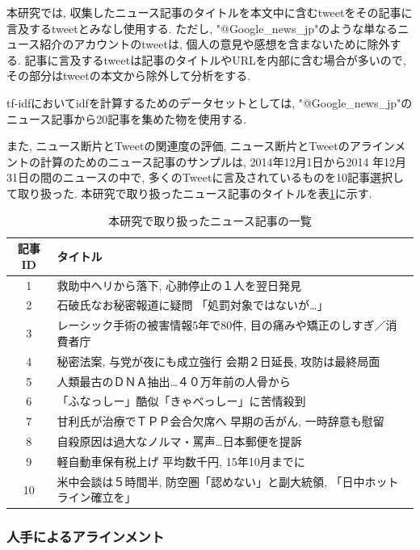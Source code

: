 \documentclass[12pt]{jarticle}
\begin{document}
本研究では, 収集したニュース記事のタイトルを本文中に含むtweetをその記事に言及するtweetとみなし使用する. ただし, "@Google\_news\_jp"のような単なるニュース紹介のアカウントのtweetは, 個人の意見や感想を含まないために除外する. 記事に言及するtweetは記事のタイトルやURLを内部に含む場合が多いので, その部分はtweetの本文から除外して分析をする.

tf-idfにおいてidfを計算するためのデータセットとしては, "@Google\_news\_jp"のニュース記事から20記事を集めた物を使用する.

また, ニュース断片とTweetの関連度の評価, ニュース断片とTweetのアラインメントの計算のためのニュース記事のサンプルは, 2014年12月1日から2014
年12月31日の間のニュースの中で, 多くのTweetに言及されているものを10記事選択して取り扱った. 本研究で取り扱ったニュース記事のタイトルを表\ref{news_table}に示す.

\begin{table}
\begin{center}
\caption{本研究で取り扱ったニュース記事の一覧}
\label{news_table}
\begin{tabular}[t]{|c||l|}
  \hline
  記事ID & タイトル \\
  \hline
  \hline
1 & 救助中ヘリから落下, 心肺停止の１人を翌日発見 \\ \hline
2 & 石破氏なお秘密報道に疑問 「処罰対象ではないが…」 \\ \hline
3 & レーシック手術の被害情報5年で80件, 目の痛みや矯正のしすぎ／消費者庁 \\ \hline
4 & 秘密法案, 与党が夜にも成立強行 会期２日延長, 攻防は最終局面 \\ \hline
5 & 人類最古のＤＮＡ抽出…４０万年前の人骨から \\ \hline
6 & 「ふなっしー」酷似「きゃべっしー」に苦情殺到 \\ \hline
7 & 甘利氏が治療でＴＰＰ会合欠席へ 早期の舌がん, 一時辞意も慰留 \\ \hline
8 & 自殺原因は過大なノルマ・罵声…日本郵便を提訴 \\ \hline
9 & 軽自動車保有税上げ 平均数千円, 15年10月までに \\ \hline
10 & 米中会談は５時間半, 防空圏「認めない」と副大統領, 「日中ホットライン確立を」 \\ \hline
\end{tabular}
\end{center}
\end{table}

\subsubsection{人手によるアラインメント}
\label{align_by_human}
\end{document}
